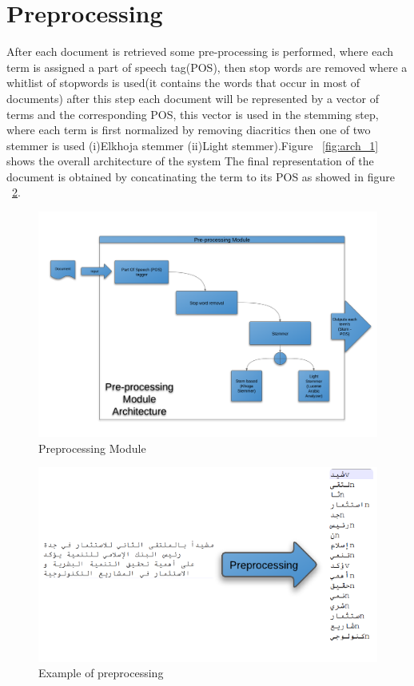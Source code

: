 \section{Preprocessing}\label{sec:preprocessing}
After each document is retrieved some pre-processing is performed, where each term is assigned a part of speech tag(POS), then stop words are removed where a whitlist of stopwords is used(it contains the words that occur in most of documents) after this step each document will be represented by a vector of terms and the corresponding POS, this vector is used in the stemming step, where each term is first normalized by removing diacritics then one of two stemmer is used (i)Elkhoja stemmer (ii)Light stemmer).Figure ~\ref{fig:arch_1} shows the overall architecture of the system
The final representation of the document is obtained by concatinating the term to its POS as showed in figure ~\ref{fig:arch_3}.

\begin{figure}[htb]
\begin{center}
\includegraphics[totalheight=1\textheight,
width=1\textwidth]{./Figures/arch_2.png}
\end{center}
\caption{Preprocessing Module}
\label{fig:arch_2}
\end{figure}


\begin{figure}[htb]
\begin{center}
\includegraphics[totalheight=.75\textheight,
width=.75\textwidth]{./Figures/arch_3.png}
\end{center}
\caption{Example of preprocessing}
\label{fig:arch_3}
\end{figure}

